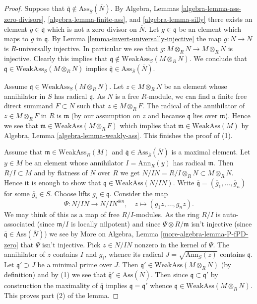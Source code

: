 \begin{proof}
Suppose that
$\overline{\mathfrak q} \not \in \text{Ass}_{\overline{S}}(\overline{N})$.
By
Algebra, Lemmas \ref{algebra-lemma-ass-zero-divisors},
\ref{algebra-lemma-finite-ass}, and
\ref{algebra-lemma-silly}
there exists an element $\overline{g} \in \overline{\mathfrak q}$
which is not a zero divisor on $\overline{N}$. Let $g \in \mathfrak q$
be an element which maps to $\overline{g}$ in $\overline{\mathfrak q}$. By
Lemma \ref{lemma-invert-universally-injective}
the map $g : N \to N$ is $R$-universally injective. In particular
we see that $g : M \otimes_R N \to M \otimes_R N$ is injective.
Clearly this implies that
$\mathfrak q \not \in \text{WeakAss}_S(M \otimes_R N)$.
We conclude that $\mathfrak q \in \text{WeakAss}_S(M \otimes_R N)$ implies
$\overline{\mathfrak q} \in \text{Ass}_{\overline{S}}(\overline{N})$.

\medskip\noindent
Assume $\mathfrak q \in \text{WeakAss}_S(M \otimes_R N)$.
Let $z \in M \otimes_R N$ be an element whose annihilator in $S$
has radical $\mathfrak q$. As $N$ is a free $R$-module, we can find
a finite free direct summand $F \subset N$ such that
$z \in M \otimes_R F$. The radical of the annihilator of
$z \in M \otimes_R F$ in $R$ is $\mathfrak m$ (by our assumption on $z$
and because $\mathfrak q$ lies over $\mathfrak m$). Hence we see that
$\mathfrak m \in \text{WeakAss}(M \otimes_R F)$ which implies
that $\mathfrak m \in \text{WeakAss}(M)$ by
Algebra, Lemma \ref{algebra-lemma-weakly-ass}.
This finishes the proof of (1).

\medskip\noindent
Assume that $\mathfrak m \in \text{WeakAss}_R(M)$ and
$\overline{\mathfrak q} \in \text{Ass}_{\overline{S}}(\overline{N})$
is a maximal element.
Let $y \in M$ be an element whose annihilator $I = \text{Ann}_R(y)$
has radical $\mathfrak m$. Then $R/I \subset M$ and by flatness of $N$
over $R$ we get $N/IN = R/I \otimes_R N \subset M \otimes_R N$. Hence
it is enough to show that $\mathfrak q \in \text{WeakAss}(N/IN)$.
Write $\overline{\mathfrak q} = (\overline{g}_1, \ldots, \overline{g}_n)$
for some $\overline{g}_i \in \overline{S}$. Choose lifts
$g_i \in \mathfrak q$. Consider the map
$$
\Psi : N/IN \longrightarrow N/IN^{\oplus n}, \quad
z \longmapsto (g_1z, \ldots, g_nz).
$$
We may think of this as a map of free $R/I$-modules. As the ring
$R/I$ is auto-associated (since $\mathfrak m/I$ is locally nilpotent)
and since $\Psi \otimes R/\mathfrak m$ isn't injective (since
$\overline{\mathfrak q} \in \text{Ass}(\overline{N})$) we see by
More on Algebra, Lemma \ref{more-algebra-lemma-P-fPD-zero}
that $\Psi$ isn't injective. Pick $z \in N/IN$ nonzero in the kernel
of $\Psi$. The annihilator of $z$ contains $I$ and $g_i$, whence
its radical $J = \sqrt{\text{Ann}_S(z)}$ contains $\mathfrak q$. 
Let $\mathfrak q' \supset J$ be a minimal prime over $J$.
Then $\mathfrak q' \in \text{WeakAss}(M \otimes_R N)$ (by definition)
and by (1) we see that
$\overline{\mathfrak q}' \in \text{Ass}(\overline{N})$.
Then since $\mathfrak q \subset \mathfrak q'$ by construction the
maximality of $\overline{\mathfrak q}$ implies $\mathfrak q = \mathfrak q'$
whence $\mathfrak q \in \text{WeakAss}(M \otimes_R N)$.
This proves part (2) of the lemma.
\end{proof}


